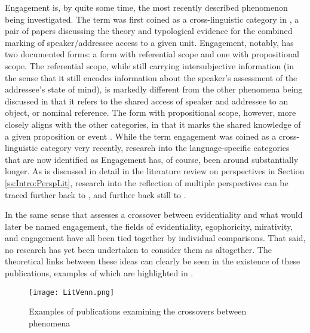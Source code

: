 Engagement is, by quite some time, the most recently described phenomenon being investigated. The term was first coined as a cross-linguistic category in , a pair of papers discussing the theory and typological evidence for the combined marking of speaker/addressee access to a given unit. Engagement, notably, has two documented forms: a form with referential scope and one with propositional scope. The referential scope, while still carrying intersubjective information (in the sense that it still encodes information about the speaker's assessment of the addressee's state of mind), is markedly different from the other phenomena being discussed in that it refers to the shared access of speaker and addressee to an object, or nominal reference. The form with propositional scope, however, more closely aligns with the other categories, in that it marks the shared knowledge of a given proposition or event \cite{EvansBergqvistSanRoque2018b}. While the term engagement was coined as a cross-linguistic category very recently, research into the language-specific categories that are now identified as Engagement has, of course, been around substantially longer. As is discussed in detail in the literature review on perspectives in Section \ref{ss:Intro:PerspLit}, research into the reflection of multiple perspectives can be traced further back to , and further back still to .

In the same sense that  assesses a crossover between evidentiality and what would later be named engagement, the fields of evidentiality, egophoricity, mirativity, and engagement have all been tied together by individual comparisons. That said, no research has yet been undertaken to consider them as altogether.  The theoretical links between these ideas can clearly be seen in the existence of these publications, examples of which are highlighted in .
\nocite{Lau2017} \nocite{Hyslop2018} \nocite{BergqvistKittila2020Book} \nocite{Widmer2020}

\begin{figure}
    \centering
    \texttt{[image: LitVenn.png]}
    \caption{Examples of publications examining the crossovers between phenomena}
    \label{fig:LitVenn}
\end{figure}
